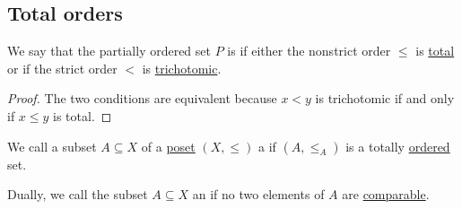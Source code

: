 \subsection{Total orders}\label{subsec:total_orders}

\begin{Definition}\label{def:totally_ordered_set}
  We say that the partially ordered set \( P \) is  if either the nonstrict order \( \leq \) is \hyperref[def:binary_relation/total]{total} or if the strict order \( < \) is \hyperref[def:binary_relation/trichotomic]{trichotomic}.
\end{Definition}
\begin{proof}
  The two conditions are equivalent because \( x < y \) is trichotomic if and only if \( x \leq y \) is total.
\end{proof}

\begin{Definition}\label{def:poset_chain}
  We call a subset \( A \subseteq X \) of a \hyperref[def:poset]{poset} \( (X, \leq) \) a  if \( (A, \leq_A) \) is a totally \hyperref[def:totally_ordered_set]{ordered} set.

  Dually, we call the subset \( A \subseteq X \) an  if no two elements of \( A \) are \hyperref[def:preordered_set/comparability]{comparable}.
\end{Definition}


